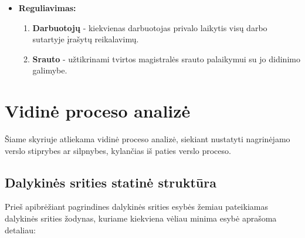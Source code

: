 \documentclass[12pt]{article}
\begin{document}
\begin{itemize}
	\item{\textbf{Reguliavimas:}}
	\begin{enumerate}
		\item{\textbf{Darbuotojų} - kiekvienas darbuotojas privalo laikytis visų darbo sutartyje įrašytų reikalavimų.}
		\item{\textbf{Srauto} - užtikrinami tvirtos magistralės srauto palaikymui su jo didinimo galimybe.}
	\end{enumerate}
	\end{itemize}
	\pagebreak

	\section{Vidinė proceso analizė}
	
	Šiame skyriuje atliekama vidinė proceso analizė, siekiant nustatyti nagrinėjamo verslo stiprybes ar silpnybes, kylančias iš paties verslo proceso.
	
	\subsection{Dalykinės srities statinė struktūra}
	
	Prieš apibrėžiant pagrindines dalykinės srities esybės žemiau pateikiamas dalykinės srities žodynas, kuriame kiekviena vėliau minima esybė aprašoma detaliau:
	
\end{document}
